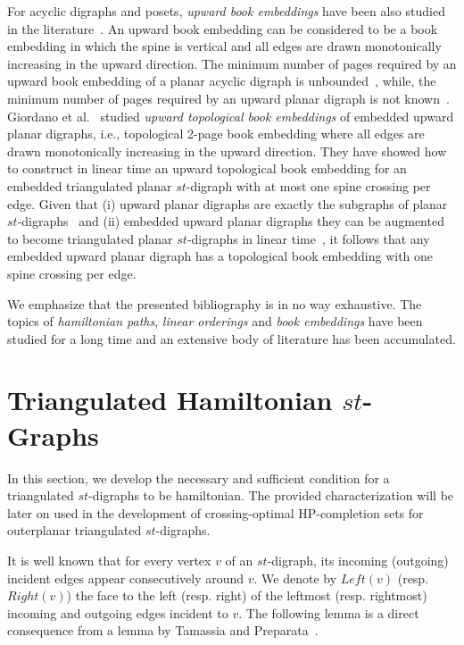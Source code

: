 \documentclass{myllncs-mixalis}
\begin{document}
For acyclic digraphs and posets, \emph{upward book embeddings} have
been also studied in the
literature~\cite{AlzohairiR96,HeathP97,HeathP99,HeathPT99,NowakowskiP89}.
An upward book embedding can be considered to be a book embedding in
which the spine is vertical and all edges are drawn monotonically
increasing in the upward direction.  The minimum number of pages
required by an upward book embedding of a planar acyclic digraph is
unbounded~\cite{HeathP97}, while, the minimum number of pages
required by an upward planar digraph is not
known~\cite{AlzohairiR96,HeathP97,NowakowskiP89}. Giordano et
al.~\cite{GiordanoLMS07} studied \emph{upward topological book
embeddings} of embedded upward planar digraphs, i.e., topological
2-page book embedding where all edges are drawn monotonically
increasing in the upward direction. They have showed how to
construct in linear time an upward topological book embedding for an
embedded triangulated planar $st$-digraph with at most one spine
crossing per edge. Given that (i) upward planar digraphs are exactly
the subgraphs of planar $st$-digraphs~\cite{DiBattistaT88,Kelly87}
and (ii) embedded upward planar digraphs they can be augmented to
become triangulated planar $st$-digraphs in linear
time~\cite{GiordanoLMS07}, it follows that any embedded upward
planar digraph has a topological book embedding with one spine
crossing per edge.

We emphasize that the presented bibliography is in no way
exhaustive. The topics of \emph{hamiltonian paths}, \emph{linear
orderings} and \emph{book embeddings} have been studied for a long
time and an extensive body of literature has been accumulated.



\section{Triangulated Hamiltonian $st$-Graphs}

In this section, we develop the necessary and sufficient condition
for a triangulated $st$-digraphs to be hamiltonian. The provided
characterization will be later on used in the development of
crossing-optimal HP-completion sets for outerplanar triangulated
$st$-digraphs.

It is well known\cite{TamassiaT86} that for every vertex $v$ of an
$st$-digraph, its incoming (outgoing) incident edges appear
consecutively around $v$. We denote by $Left(v)$ (resp. $Right(v)$)
the face to the left (resp. right) of the leftmost (resp. rightmost)
incoming and outgoing edges incident to $v$. The following lemma is
a direct consequence from a lemma by Tamassia and
Preparata~\cite[Lemma 7]{TamassiaP90}.
\end{document}
